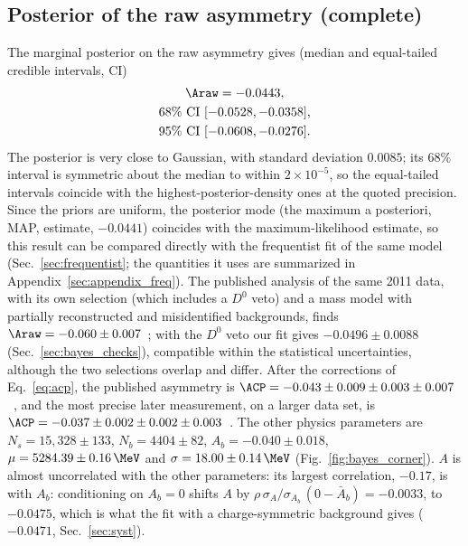 \subsection{Posterior of the raw asymmetry (complete)}
The marginal posterior on the raw asymmetry gives (median and equal-tailed credible intervals, CI)
\begin{gather*}
\Araw = -0.0443, \\
68\%~\text{CI}~[-0.0528,-0.0358], \\ 95\%~\text{CI}~[-0.0608,-0.0276].
\end{gather*}
The posterior is very close to Gaussian, with standard deviation $0.0085$; its 68\% interval is symmetric about the median to within $2\times10^{-5}$, so the equal-tailed intervals coincide with the highest-posterior-density ones at the quoted precision. Since the priors are uniform, the posterior mode (the maximum a posteriori, MAP, estimate, $-0.0441$) coincides with the maximum-likelihood estimate, so this result can be compared directly with the frequentist fit of the same model (Sec.~\ref{sec:frequentist}; the quantities it uses are summarized in Appendix~\ref{sec:appendix_freq}). The published analysis of the same 2011 data, with its own selection (which includes a $D^0$ veto) and a mass model with partially reconstructed and misidentified backgrounds, finds $\Araw=-0.060\pm0.007$~\cite{lhcb_cpv_2013}; with the $D^0$ veto our fit gives $-0.0496\pm0.0088$ (Sec.~\ref{sec:bayes_checks}), compatible within the statistical uncertainties, although the two selections overlap and differ. After the corrections of Eq.~\eqref{eq:acp}, the published asymmetry is $\ACP=-0.043\pm0.009\pm0.003\pm0.007$~\cite{lhcb_cpv_2013}, and the most precise later measurement, on a larger data set, is $\ACP=-0.037\pm0.002\pm0.002\pm0.003$~\cite{lhcb_cpv_prd2023,lhcb_cpv_paper}. The other physics parameters are $N_s=15{,}328\pm133$, $N_b=4404\pm82$, $A_b=-0.040\pm0.018$, $\mu=5284.39\pm0.16\,\MeV$ and $\sigma=18.00\pm0.14\,\MeV$ (Fig.~\ref{fig:bayes_corner}). $A$ is almost uncorrelated with the other parameters: its largest correlation, $-0.17$, is with $A_b$: conditioning on $A_b=0$ shifts $A$ by $\rho\,\sigma_A/\sigma_{A_b}\,(0-\bar A_b)=-0.0033$, to $-0.0475$, which is what the fit with a charge-symmetric background gives ($-0.0471$, Sec.~\ref{sec:syst}).

